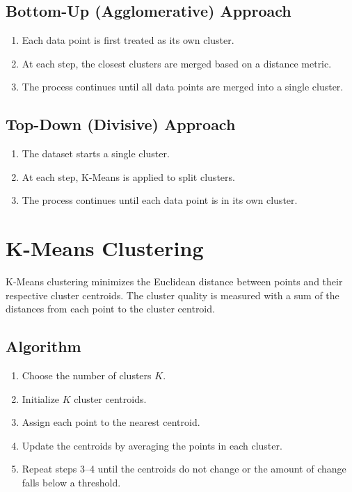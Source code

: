 \documentclass{article}
\begin{document}
\subsection*{Bottom-Up (Agglomerative) Approach}
\begin{enumerate}
    \item Each data point is first treated as its own cluster.
    \item At each step, the closest clusters are merged based on a distance metric.
    \item The process continues until all data points are merged into a single cluster.
\end{enumerate}

\subsection*{Top-Down (Divisive) Approach}
\begin{enumerate}
    \item The dataset starts a single cluster.
    \item At each step, K-Means is applied to split clusters.
    \item The process continues until each data point is in its own cluster.
\end{enumerate}

\section*{K-Means Clustering}

K-Means clustering minimizes the Euclidean distance between points and their respective cluster centroids. The cluster quality is measured with a sum of the distances from each point to the cluster centroid.

\subsection*{Algorithm}

\begin{enumerate}
    \item Choose the number of clusters $K$.
    \item Initialize $K$ cluster centroids.
    \item Assign each point to the nearest centroid.
    \item Update the centroids by averaging the points in each cluster.
    \item Repeat steps 3--4 until the centroids do not change or the amount of change falls below a threshold.
\end{enumerate}
\end{document}
